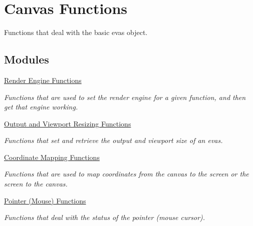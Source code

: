 \section{Canvas Functions}
\label{group__Evas__Canvas}


Functions that deal with the basic evas object.  


\subsection*{Modules}
\begin{DoxyCompactItemize}
\item 
\hyperlink{group__Evas__Output__Method}{Render Engine Functions}


\begin{DoxyCompactList}\small\item\em Functions that are used to set the render engine for a given function, and then get that engine working. \item\end{DoxyCompactList}

\item 
\hyperlink{group__Evas__Output__Size}{Output and Viewport Resizing Functions}


\begin{DoxyCompactList}\small\item\em Functions that set and retrieve the output and viewport size of an evas. \item\end{DoxyCompactList}

\item 
\hyperlink{group__Evas__Coord__Mapping__Group}{Coordinate Mapping Functions}


\begin{DoxyCompactList}\small\item\em Functions that are used to map coordinates from the canvas to the screen or the screen to the canvas. \item\end{DoxyCompactList}

\item 
\hyperlink{group__Evas__Pointer__Group}{Pointer (Mouse) Functions}


\begin{DoxyCompactList}\small\item\em Functions that deal with the status of the pointer (mouse cursor). \item\end{DoxyCompactList}


\end{DoxyCompactItemize}
